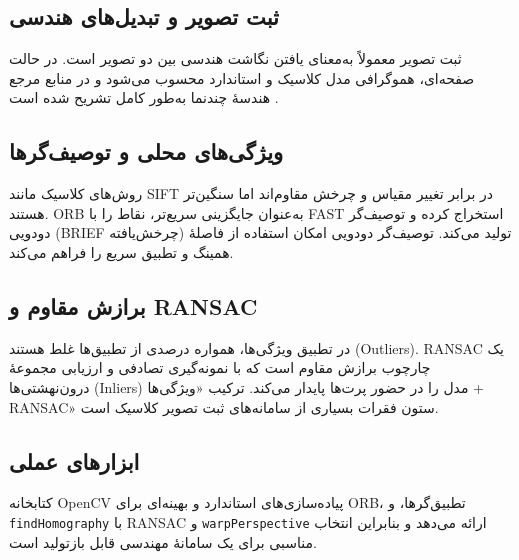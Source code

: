 
\subsection{ثبت تصویر و تبدیل‌های هندسی}
ثبت تصویر معمولاً به‌معنای یافتن نگاشت هندسی بین دو تصویر است. در حالت صفحه‌ای، هموگرافی مدل کلاسیک و استاندارد محسوب می‌شود و در منابع مرجع هندسهٔ چندنما به‌طور کامل تشریح شده است \cite{HartleyZisserman2004}.

\subsection{ویژگی‌های محلی و توصیف‌گرها}
روش‌های کلاسیک مانند SIFT \cite{Lowe2004SIFT} در برابر تغییر مقیاس و چرخش مقاوم‌اند اما سنگین‌تر هستند. ORB \cite{Rublee2011ORB} به‌عنوان جایگزینی سریع‌تر، نقاط را با FAST استخراج کرده و توصیف‌گر دودویی (BRIEF چرخش‌یافته) تولید می‌کند. توصیف‌گر دودویی امکان استفاده از فاصلهٔ همینگ و تطبیق سریع را فراهم می‌کند.

\subsection{برازش مقاوم و RANSAC}
در تطبیق ویژگی‌ها، همواره درصدی از تطبیق‌ها غلط هستند (Outliers). RANSAC \cite{FischlerBolles1981} یک چارچوب برازش مقاوم است که با نمونه‌گیری تصادفی و ارزیابی مجموعهٔ درون‌نهشتی‌ها (Inliers) مدل را در حضور پرت‌ها پایدار می‌کند. ترکیب «ویژگی‌ها + RANSAC» ستون فقرات بسیاری از سامانه‌های ثبت تصویر کلاسیک است.

\subsection{ابزارهای عملی}
کتابخانه OpenCV \cite{Bradski2000OpenCV} پیاده‌سازی‌های استاندارد و بهینه‌ای برای ORB، تطبیق‌گرها، و \texttt{findHomography} با RANSAC و \texttt{warpPerspective} ارائه می‌دهد و بنابراین انتخاب مناسبی برای یک سامانهٔ مهندسی قابل بازتولید است.
